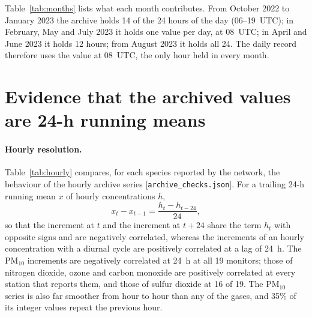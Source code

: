 \documentclass[11pt]{article}
\newcommand*{\ugm}{\ensuremath{\mu\mathrm{g\,m^{-3}}}}
\newcommand*{\pmten}{\ensuremath{\mathrm{PM_{10}}}}
\begin{document}
Table~\ref{tab:months} lists what each month contributes. From October 2022 to January 2023 the
archive holds 14 of the 24 hours of the day (06--19~UTC); in February, May and July 2023 it holds
one value per day, at 08~UTC; in April and June 2023 it holds 12 hours; from August 2023 it holds
all 24. The daily record therefore uses the value at 08~UTC, the only hour held in every month.

\begin{table}[ht]\centering\small
\caption{Months held by the three-hourly record and by the archive. ``Days with 08~UTC value'' counts
days on which at least one monitor reports at 08~UTC; the network median and the share of
monitor-days above 45~\ugm{} are computed from those values (24-h means ending 08~UTC).}
\label{tab:months}
\resizebox{0.9\textwidth}{!}{}
\end{table}

\section{Evidence that the archived values are 24-h running means}

\paragraph{Hourly resolution.} Table~\ref{tab:hourly} compares, for each species reported by the
network, the behaviour of the hourly archive series [\texttt{archive\_checks.json}]. For a
trailing 24-h running mean $x$ of hourly concentrations $h$,
\[
x_t - x_{t-1} = \frac{h_t - h_{t-24}}{24},
\]
so that the increment at $t$ and the increment at $t+24$ share the term $h_t$ with opposite
signs and are negatively correlated, whereas the increments of an hourly concentration with a
diurnal cycle are positively correlated at a lag of 24~h. The \pmten{} increments are negatively
correlated at 24~h at all 19 monitors; those of nitrogen dioxide, ozone and carbon monoxide are
positively correlated at every station that reports them, and those of sulfur dioxide at 16 of
19. The \pmten{} series is also far smoother from hour to hour than any of the gases, and 35\%
of its integer values repeat the previous hour.

\begin{table}[ht]\centering\small
\caption{Hourly signature of the archived series, by species. Medians over stations. ACF(1~h):
lag-1~h autocorrelation of the series. ``Unchanged'': share of values equal to the value one
hour earlier. The last four columns refer to the autocorrelation of the hourly increments; the
range at 24~h is over stations.}
\label{tab:hourly}
\resizebox{\textwidth}{!}{}
\end{table}
\end{document}
